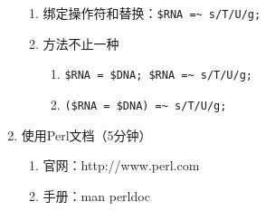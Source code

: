 \documentclass{TIJMUjiaoanLL}
\begin{document}
\begin{enumerate}
\begin{enumerate}
      \item 绑定操作符和替换：\verb|$RNA =~ s/T/U/g;|
      \item 方法不止一种
	\begin{enumerate}
	  \item \verb|$RNA = $DNA; $RNA =~ s/T/U/g;|
	  \item \verb|($RNA = $DNA) =~ s/T/U/g;|
	\end{enumerate}
    \end{enumerate}
  \item 使用Perl文档（5分钟）
\vspace*{-1em}
\begin{multicols}{2}
    \begin{enumerate}
      \item 官网：http://www.perl.com
      \item 手册：man perldoc
    \end{enumerate}
\end{multicols}
\vspace*{-1em}

\otherTail
\newpage
\otherHeader


\end{enumerate}
\end{document}
